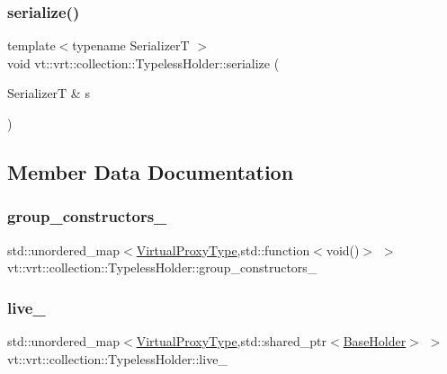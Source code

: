 \subsubsection{\texorpdfstring{serialize()}{serialize()}}
{\footnotesize\ttfamily template$<$typename SerializerT $>$ \\
void vt\+::vrt\+::collection\+::\+Typeless\+Holder\+::serialize (\begin{DoxyParamCaption}\item[{SerializerT \&}]{s }\end{DoxyParamCaption})\hspace{0.3cm}{\ttfamily [inline]}}



\subsection{Member Data Documentation}
\mbox{\label{structvt_1_1vrt_1_1collection_1_1_typeless_holder_af0e61d3465642c9ebf6b30e16ed843f0}} 
\subsubsection{\texorpdfstring{group\+\_\+constructors\+\_\+}{group\_constructors\_}}
{\footnotesize\ttfamily std\+::unordered\+\_\+map$<$\hyperlink{namespacevt_a1b417dd5d684f045bb58a0ede70045ac}{Virtual\+Proxy\+Type},std\+::function$<$void()$>$ $>$ vt\+::vrt\+::collection\+::\+Typeless\+Holder\+::group\+\_\+constructors\+\_\+\hspace{0.3cm}{\ttfamily [private]}}

\mbox{\label{structvt_1_1vrt_1_1collection_1_1_typeless_holder_a517ed716d418dd5260e072fa2eb638df}} 
\subsubsection{\texorpdfstring{live\+\_\+}{live\_}}
{\footnotesize\ttfamily std\+::unordered\+\_\+map$<$\hyperlink{namespacevt_a1b417dd5d684f045bb58a0ede70045ac}{Virtual\+Proxy\+Type},std\+::shared\+\_\+ptr$<$\hyperlink{structvt_1_1vrt_1_1collection_1_1_base_holder}{Base\+Holder}$>$ $>$ vt\+::vrt\+::collection\+::\+Typeless\+Holder\+::live\+\_\+\hspace{0.3cm}{\ttfamily [private]}}

